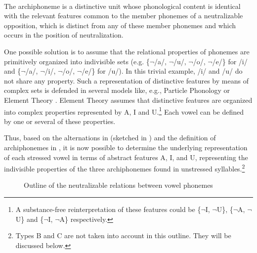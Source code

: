 \documentclass[output=paper,modfonts,newtxmath,hidelinks,]{langscibook}
\begin{document}
 \citep[201]{Akamatsu1988}\label{5:18}\\
The archiphoneme is a distinctive unit whose phonological content is identical with the relevant features common to the member phonemes of a neutralizable opposition, which is distinct from any of these member phonemes and which occurs in the position of neutralization.
\z

\noindent One possible solution is to assume that the relational properties of phonemes are primitively organized into indivisible sets (e.g. \{$\neg$/a/, $\neg$/u/, $\neg$/o/, $\neg$/e/\} for /i/ and \{$\neg$/a/, $\neg$/i/, $\neg$/o/, $\neg$/e/\} for /u/). In this trivial example, /i/ and /u/ do not share any property. Such a representation of distinctive features by means of complex sets is defended in several models like, e.g., Particle Phonology \citep{Schane1984} or Element Theory \citep{Kaye-etal1985}. Element Theory assumes that distinctive features are organized into complex properties represented by {\textbar}A{\textbar}, {\textbar}I{\textbar} and {\textbar}U{\textbar}.\footnote{A substance-free reinterpretation of these features could be \{$\neg${\textbar}I{\textbar}, $\neg${\textbar}U{\textbar}\}, \{$\neg${\textbar}A{\textbar}, $\neg${\textbar}U{\textbar}\} and \{$\neg${\textbar}I{\textbar}, $\neg${\textbar}A{\textbar}\} respectively.} Each vowel can be defined by one or several of these properties.

Thus, based on the alternations in  (sketched in ) and the definition of archiphonemes in , it is now possible to determine the underlying representation of each stressed vowel in terms of abstract features {\textbar}A{\textbar}, {\textbar}I{\textbar}, and {\textbar}U{\textbar}, representing the indivisible properties of the three archiphonemes found in unstressed syllables.\footnote{Types B and C are not taken into account in this outline. They will be discussed below.}


\begin{figure}
\caption{Outline of the neutralizable relations between vowel phonemes}
\label{5:f3}
\end{figure}
\end{document}
